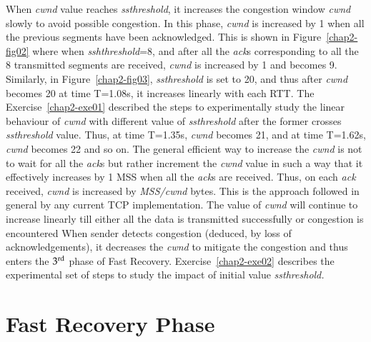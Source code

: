 \begin{multicols}{2}
When \textit{cwnd} value reaches \textit{ssthreshold}, it increases the congestion window \textit{cwnd} slowly to avoid possible congestion. In this phase, \textit{cwnd} is increased by 1 when all the previous segments have been acknowledged. This is shown in Figure~\ref{chap2-fig02}  where when \textit{sshthreshold}=8, and after all the \textit{ack}s corresponding to all the 8 transmitted segments are received, \textit{cwnd} is increased by 1 and becomes 9. Similarly, in Figure~\ref{chap2-fig03}, \textit{ssthreshold} is set to 20, and thus after \textit{cwnd} becomes 20 at time T=1.08s, it increases linearly with each RTT. The Exercise~\ref{chap2-exe01} described the steps to experimentally study the linear behaviour of \textit{cwnd} with different value of \textit{ssthreshold} after the former crosses \textit{ssthreshold} value. Thus, at time T=1.35s, \textit{cwnd} becomes 21, and at time T=1.62s, \textit{cwnd} becomes 22 and so on. The general efficient way to increase the \textit{cwnd} is not to wait for all the \textit{ack}s but rather increment the \textit{cwnd} value in such a way that it effectively increases by 1 MSS when all the \textit{ack}s are received. Thus, on each \textit{ack} received, \textit{cwnd} is increased by \textit{MSS/cwnd} bytes. This is the approach followed in general by any current TCP implementation. The value of \textit{cwnd} will continue to increase linearly till either all the data is transmitted successfully or congestion is encountered When sender detects congestion (deduced, by loss of acknowledgements), it decreases the \textit{cwnd} to mitigate the congestion and thus enters the ${\rm 3}^{\text {rd}}$ phase of Fast Recovery. Exercise~\ref{chap2-exe02} describes the experimental set of steps to study the impact of initial value \textit{ssthreshold.}

\section{Fast Recovery Phase}


\end{multicols}
